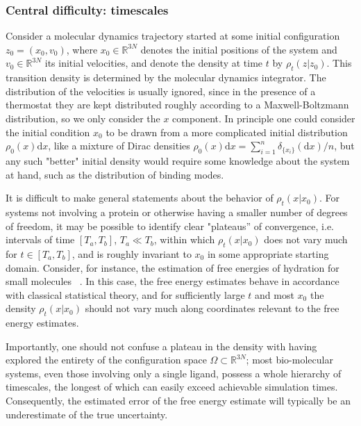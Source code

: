 \documentclass[9pt,bestpractices]{livecoms}
\begin{document}
\subsubsection{Central difficulty: timescales}\label{sec:timescales}

Consider a molecular dynamics trajectory started at some initial configuration $z_0 = (x_0, v_0)$, where $x_0 \in \mathbb{R}^{3 N}$ denotes the initial positions of the system and $v_0 \in \mathbb{R}^{3 N}$ its initial velocities, and denote the density at time $t$ by $\rho_t(z|z_0)$. This transition density is determined by the molecular dynamics integrator. The distribution of the velocities is usually ignored, since in the presence of a thermostat they are kept distributed roughly according to a Maxwell-Boltzmann distribution, so we only consider the $x$ component. In principle one could consider the initial condition $x_0$ to be drawn from a more complicated initial distribution $\rho_0(x) \mathrm{d}x$, like a mixture of Dirac densities $\rho_0(x) \mathrm{d}x = \sum_{i = 1}^n \delta_{\{ x_i \}}(\mathrm{d}x) / n$, but any such "better" initial density would require some knowledge about the system at hand, such as the distribution of binding modes. 

It is difficult to make general statements about the behavior of $\rho_t (x | x_0)$. For systems not involving a protein or otherwise having a smaller number of degrees of freedom, it may be possible to identify clear "plateaus'' of convergence, i.e. intervals of time $[T_a, T_b]$, $T_a \ll T_b$, within which $\rho_t (x | x_0)$ does not vary much for $t \in [T_a, T_b]$, and is roughly invariant to $x_0 $ in some appropriate starting domain. Consider, for instance, the estimation of free energies of hydration for small molecules ~\cite{paliwal2011benchmark}. In this case, the free energy estimates behave in accordance with classical statistical theory, and for sufficiently large $t$ and most $x_0$ the density $\rho_t (x | x_0)$ should not vary much along coordinates relevant to the free energy estimates.


Importantly, one should not confuse a plateau in the density with having explored the entirety of the configuration space $\Omega \subset \mathbb{R}^{3N}$; most bio-molecular systems, even those involving only a single ligand, possess a whole hierarchy of timescales, the longest of which can easily exceed achievable simulation times. Consequently, the estimated error of the free energy estimate will typically be an underestimate of the true uncertainty.
\end{document}
